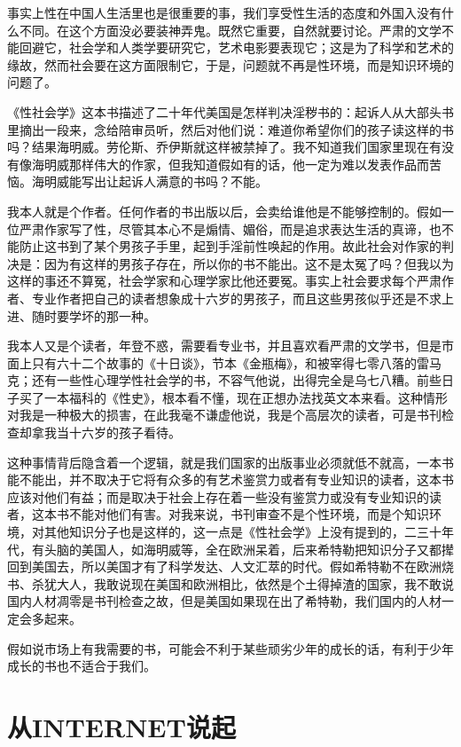 事实上性在中国人生活里也是很重要的事，我们享受性生活的态度和外国入没有什么不同。在这个方面没必要装神弄鬼。既然它重要，自然就要讨论。严肃的文学不能回避它，社会学和人类学要研究它，艺术电影要表现它；这是为了科学和艺术的缘故，然而社会要在这方面限制它，于是，问题就不再是性环境，而是知识环境的问题了。 

《性社会学》这本书描述了二十年代美国是怎样判决淫秽书的：起诉人从大部头书里摘出一段来，念给陪审员听，然后对他们说：难道你希望你们的孩子读这样的书吗？结果海明威。劳伦斯、乔伊斯就这样被禁掉了。我不知道我们国家里现在有没有像海明威那样伟大的作家，但我知道假如有的话，他一定为难以发表作品而苦恼。海明威能写出让起诉人满意的书吗？不能。 

我本人就是个作者。任何作者的书出版以后，会卖给谁他是不能够控制的。假如一位严肃作家写了性，尽管其本心不是煽情、媚俗，而是追求表达生活的真谛，也不能防止这书到了某个男孩子手里，起到手淫前性唤起的作用。故此社会对作家的判决是：因为有这样的男孩子存在，所以你的书不能出。这不是太冤了吗？但我以为这样的事还不算冤，社会学家和心理学家比他还要冤。事实上社会要求每个严肃作者、专业作者把自己的读者想象成十六岁的男孩子，而且这些男孩似乎还是不求上进、随时要学坏的那一种。 

我本人又是个读者，年登不惑，需要看专业书，并且喜欢看严肃的文学书，但是市面上只有六十二个故事的《十日谈》，节本《金瓶梅》，和被宰得七零八落的雷马克；还有一些性心理学性社会学的书，不容气他说，出得完全是乌七八糟。前些日子买了一本福科的《性史》，根本看不懂，现在正想办法找英文本来看。这种情形对我是一种极大的损害，在此我毫不谦虚他说，我是个高层次的读者，可是书刊检查却拿我当十六岁的孩子看待。 

这种事情背后隐含着一个逻辑，就是我们国家的出版事业必须就低不就高，一本书能不能出，并不取决于它将有众多的有艺术鉴赏力或者有专业知识的读者，这本书应该对他们有益；而是取决于社会上存在着一些没有鉴赏力或没有专业知识的读者，这本书不能对他们有害。对我来说，书刊审查不是个性环境，而是个知识环境，对其他知识分子也是这样的，这一点是《性社会学》上没有提到的，二三十年代，有头脑的美国人，如海明威等，全在欧洲呆着，后来希特勒把知识分子又都撵回到美国去，所以美国才有了科学发达、人文汇萃的时代。假如希特勒不在欧洲烧书、杀犹大人，我敢说现在美国和欧洲相比，依然是个土得掉渣的国家，我不敢说国内人材凋零是书刊检查之故，但是美国如果现在出了希特勒，我们国内的人材一定会多起来。 

假如说市场上有我需要的书，可能会不利于某些顽劣少年的成长的话，有利于少年成长的书也不适合于我们。

\chapter{从INTERNET说起}

